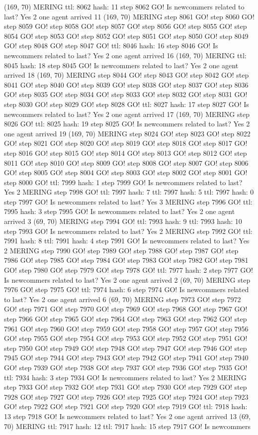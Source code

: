 (169, 70) MERING ttl: 8062 hash: 11 step 8062 GO! Is newcommers related to last? Yes 2 one agent arrived 11 (169, 70) MERING step 8061 GO! step 8060 GO! step 8059 GO! step 8058 GO! step 8057 GO! step 8056 GO! step 8055 GO! step 8054 GO! step 8053 GO! step 8052 GO! step 8051 GO! step 8050 GO! step 8049 GO! step 8048 GO! step 8047 GO! ttl: 8046 hash: 16 step 8046 GO! Is newcommers related to last? Yes 2 one agent arrived 16 (169, 70) MERING ttl: 8045 hash: 18 step 8045 GO! Is newcommers related to last? Yes 2 one agent arrived 18 (169, 70) MERING step 8044 GO! step 8043 GO! step 8042 GO! step 8041 GO! step 8040 GO! step 8039 GO! step 8038 GO! step 8037 GO! step 8036 GO! step 8035 GO! step 8034 GO! step 8033 GO! step 8032 GO! step 8031 GO! step 8030 GO! step 8029 GO! step 8028 GO! ttl: 8027 hash: 17 step 8027 GO! Is newcommers related to last? Yes 2 one agent arrived 17 (169, 70) MERING step 8026 GO! ttl: 8025 hash: 19 step 8025 GO! Is newcommers related to last? Yes 2 one agent arrived 19 (169, 70) MERING step 8024 GO! step 8023 GO! step 8022 GO! step 8021 GO! step 8020 GO! step 8019 GO! step 8018 GO! step 8017 GO! step 8016 GO! step 8015 GO! step 8014 GO! step 8013 GO! step 8012 GO! step 8011 GO! step 8010 GO! step 8009 GO! step 8008 GO! step 8007 GO! step 8006 GO! step 8005 GO! step 8004 GO! step 8003 GO! step 8002 GO! step 8001 GO! step 8000 GO! ttl: 7999 hash: 1 step 7999 GO! Is newcommers related to last? Yes 2 MERING step 7998 GO! ttl: 7997 hash: 7 ttl: 7997 hash: 5 ttl: 7997 hash: 0 step 7997 GO! Is newcommers related to last? Yes 3 MERING step 7996 GO! ttl: 7995 hash: 3 step 7995 GO! Is newcommers related to last? Yes 2 one agent arrived 3 (69, 70) MERING step 7994 GO! ttl: 7993 hash: 9 ttl: 7993 hash: 10 step 7993 GO! Is newcommers related to last? Yes 2 MERING step 7992 GO! ttl: 7991 hash: 8 ttl: 7991 hash: 4 step 7991 GO! Is newcommers related to last? Yes 2 MERING step 7990 GO! step 7989 GO! step 7988 GO! step 7987 GO! step 7986 GO! step 7985 GO! step 7984 GO! step 7983 GO! step 7982 GO! step 7981 GO! step 7980 GO! step 7979 GO! step 7978 GO! ttl: 7977 hash: 2 step 7977 GO! Is newcommers related to last? Yes 2 one agent arrived 2 (69, 70) MERING step 7976 GO! step 7975 GO! ttl: 7974 hash: 6 step 7974 GO! Is newcommers related to last? Yes 2 one agent arrived 6 (69, 70) MERING step 7973 GO! step 7972 GO! step 7971 GO! step 7970 GO! step 7969 GO! step 7968 GO! step 7967 GO! step 7966 GO! step 7965 GO! step 7964 GO! step 7963 GO! step 7962 GO! step 7961 GO! step 7960 GO! step 7959 GO! step 7958 GO! step 7957 GO! step 7956 GO! step 7955 GO! step 7954 GO! step 7953 GO! step 7952 GO! step 7951 GO! step 7950 GO! step 7949 GO! step 7948 GO! step 7947 GO! step 7946 GO! step 7945 GO! step 7944 GO! step 7943 GO! step 7942 GO! step 7941 GO! step 7940 GO! step 7939 GO! step 7938 GO! step 7937 GO! step 7936 GO! step 7935 GO! ttl: 7934 hash: 3 step 7934 GO! Is newcommers related to last? Yes 2 MERING step 7933 GO! step 7932 GO! step 7931 GO! step 7930 GO! step 7929 GO! step 7928 GO! step 7927 GO! step 7926 GO! step 7925 GO! step 7924 GO! step 7923 GO! step 7922 GO! step 7921 GO! step 7920 GO! step 7919 GO! ttl: 7918 hash: 13 step 7918 GO! Is newcommers related to last? Yes 2 one agent arrived 13 (69, 70) MERING ttl: 7917 hash: 12 ttl: 7917 hash: 15 step 7917 GO! Is newcommers 